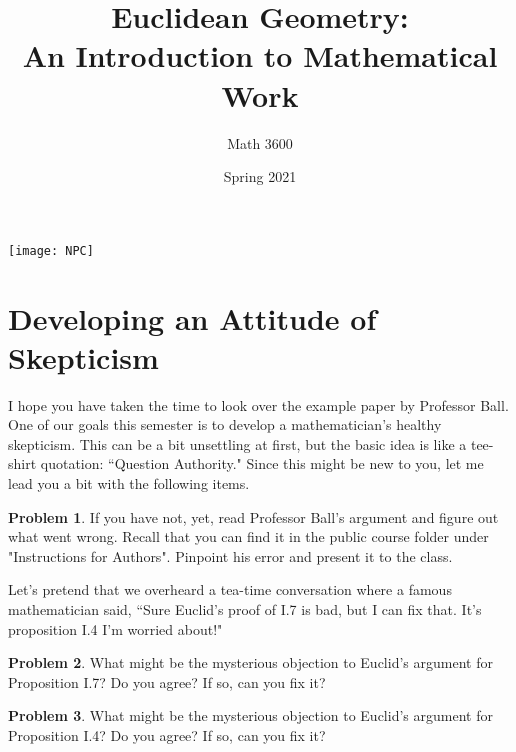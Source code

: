 \documentclass{tufte-handout}
\title{Euclidean Geometry:\\An Introduction to Mathematical Work}
\author[]{Math 3600}
\date{Spring 2021}
\theoremstyle{definition}
\newtheorem{problem}{Problem}[section]
\begin{document}
\maketitle
\begin{marginfigure}
    \texttt{[image: NPC]}
\end{marginfigure}

\setcounter{section}{4}
\section{Developing an Attitude of Skepticism}

I hope you have taken the time to look over the example paper by Professor Ball.
One of our goals this semester is to develop a mathematician's healthy skepticism.
This can be a bit unsettling at first, but the basic idea is like a tee-shirt quotation: ``Question Authority."
Since this might be new to you, let me lead you a bit with the following items.

\begin{problem}\label{prob:Ball}
If you have not, yet, read Professor Ball's argument and figure out what went wrong.
Recall that you can find it in the public course folder under "Instructions for Authors".
Pinpoint his error and present it to the class.
\end{problem}

Let's pretend that we overheard a tea-time conversation where a famous mathematician said, ``Sure Euclid's proof of I.7 is bad, but I can fix that.
It's proposition I.4 I'm worried about!"

\begin{problem}\label{prob:fix-I.7}
What might be the mysterious objection to Euclid's argument for Proposition I.7? Do you agree? If so, can you fix it?
\end{problem}

\begin{problem}\label{prob:fix-I.4}
What might be the mysterious objection to Euclid's argument for Proposition I.4? Do you agree? If so, can you fix it?
\end{problem}
\end{document}
